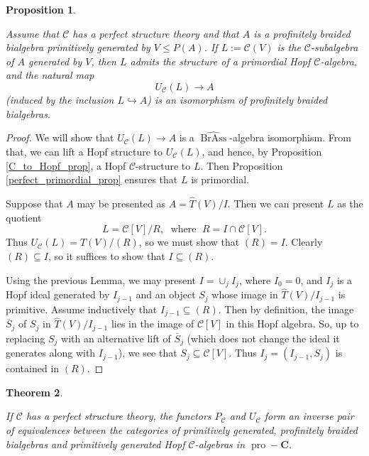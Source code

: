 \documentclass[12pt]{article}
\DeclareMathOperator{\pro}{pro}
\DeclareMathOperator{\BrAss}{BrAss}
\newcommand{\BrAsshat}{\widehat{\BrAss}} %
\newcommand{\That}{\widehat{T}}
\newcommand{\CC} {\mathcal{C}}
\newcommand{\bC} {\mathbf{C}}
\newcommand{\proC}{\pro\!-\bC}
\theoremstyle{plain}
\newtheorem{thm}{Theorem}[section]
\newtheorem{prop}[thm]{Proposition}
\theoremstyle{definition}
\theoremstyle{remark}
\begin{document}
\begin{prop} \label{perfect_prop}

Assume that $\CC$ has a perfect structure theory and that $A$ is a profinitely braided bialgebra primitively generated by $V \leq P(A)$.  If $L:=\CC(V)$ is the $\CC$-subalgebra of $A$ generated by $V$, then $L$ admits the structure of a primordial Hopf $\CC$-algebra, and the natural map
%
$$U_{\CC}(L) \to A$$
%
(induced by the inclusion $L \hookrightarrow A$) is an isomorphism of profinitely braided bialgebras.

\end{prop}

\begin{proof}

We will show that $U_{\CC}(L) \to A$ is a $\BrAsshat$-algebra isomorphism.  From that, we can lift a Hopf structure to $U_{\CC}(L)$, and hence, by Proposition \ref{C_to_Hopf_prop}, a Hopf $\CC$-structure to $L$.  Then Proposition \ref{perfect_primordial_prop} ensures that $L$ is primordial.

Suppose that $A$ may be presented as $A=\That(V)/I$.  Then we can present $L$ as the quotient
%
$$L = \CC[V]/R, \; \mbox{ where } \; R = I \cap \CC[V].$$
%
Thus $U_{\CC}(L) = \That(V)/(R)$, so we must show that $(R) = I$.  Clearly $(R) \subseteq I$, so it suffices to show that $I \subseteq (R)$.  

Using the previous Lemma, we may present $I = \cup_j I_j$, where $I_0 = 0$, and $I_j$ is a Hopf ideal generated by $I_{j-1}$ and an object $S_j$ whose image in $\That(V)/I_{j-1}$ is primitive.  Assume inductively that $I_{j-1} \subseteq (R)$.  Then by definition, the image $\overline{S}_j$ of $S_j$ in $\That(V)/I_{j-1}$ lies in the image of $\CC[V]$ in this Hopf algebra.  So, up to replacing $S_j$ with an alternative lift of $\overline{S}_j$ (which does not change the ideal it generates along with $I_{j-1}$), we see that $S_j \subseteq \CC[V]$.  Thus $I_j = (I_{j-1}, S_j)$ is contained in $(R)$.

\end{proof}


\begin{thm} \label{mm_equiv_thm}

If $\CC$ has a perfect structure theory, the functors $P_{\CC}$ and $U_{\CC}$ form an inverse pair of equivalences between the categories of primitively generated, profinitely braided bialgebras and primitively generated Hopf $\CC$-algebras in $\proC$. 

\end{thm}
\end{document}
